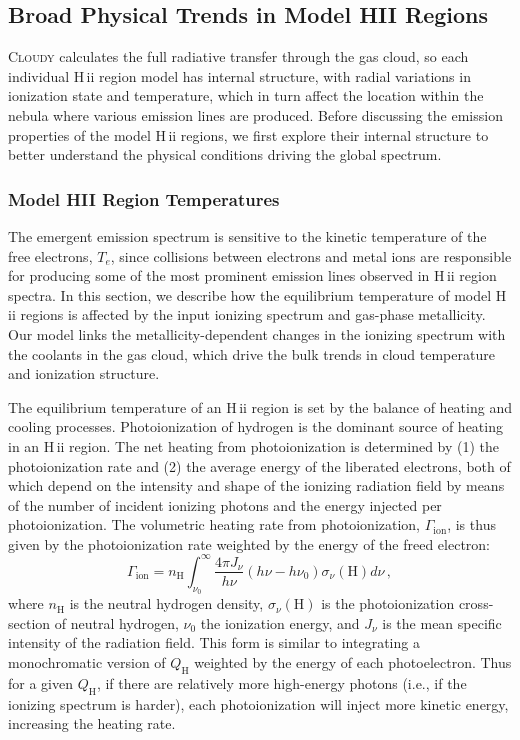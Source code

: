 \documentclass[linenumbers, trackchanges, tighten]{aastex61}%
\newcommand{\Cloudy}{\textsc{Cloudy}\xspace}
\newcommand{\Te}{\ensuremath{T_{e}}}
\newcommand{\hii}{H\,{\sc ii}\xspace}
\newcommand{\nH}{\ensuremath{n_{\mathrm{H}}}}
\newcommand{\QH}{\ensuremath{Q_{\mathrm{H}}}}
\newcommand{\Heat}{\ensuremath{\Gamma_{\mathrm{ion}}}}
\begin{document}
\subsection{Broad Physical Trends in Model HII Regions}\label{sec:models:broad}

\Cloudy calculates the full radiative transfer through the gas cloud, so each individual \hii region model has internal structure, with radial variations in ionization state and temperature, which in turn affect the location within the nebula where various emission lines are produced. Before discussing the emission properties of the model \hii regions, we first explore their internal structure to better understand the physical conditions driving the global spectrum.

\subsubsection{Model HII Region Temperatures}\label{sec:models:broad:temp}

The emergent emission spectrum is sensitive to the kinetic temperature of the free electrons, \Te{}, since collisions between electrons and metal ions are responsible for producing some of the most prominent emission lines observed in \hii region spectra. In this section, we describe how the equilibrium temperature of model \hii regions is affected by the input ionizing spectrum and gas-phase metallicity. Our model links the metallicity-dependent changes in the ionizing spectrum with the coolants in the gas cloud, which drive the bulk trends in cloud temperature and ionization structure.

The equilibrium temperature of an \hii region is set by the balance of heating and cooling processes. Photoionization of hydrogen is the dominant source of heating in an \hii region. The net heating from photoionization is determined by (1) the photoionization rate and (2) the average energy of the liberated electrons, both of which depend on the intensity and shape of the ionizing radiation field by means of the number of incident ionizing photons and the energy injected per photoionization. The volumetric heating rate from photoionization, \Heat{}, is thus given by the photoionization rate weighted by the energy of the freed electron:
\begin{equation}\label{eq:heat}
    \Gamma_{\mathrm{ion}} = \nH{} \int_{\nu_0}^{\infty} \frac{4 \pi J_{\nu}}{h\nu} (h \nu - h \nu_0) \sigma_{\nu}(\mathrm{H}) d\nu \,,
\end{equation}
where \nH{} is the neutral hydrogen density, $\sigma_{\nu}(\mathrm{H})$ is the photoionization cross-section of neutral hydrogen, $\nu_0$ the ionization energy,  and $J_{\nu}$ is the mean specific intensity of the radiation field. This form is similar to integrating a monochromatic version of \QH{} weighted by the energy of each photoelectron. Thus for a given \QH{}, if there are relatively more high-energy photons (i.e., if the ionizing spectrum is harder), each photoionization will inject more kinetic energy, increasing the heating rate.
\end{document}
